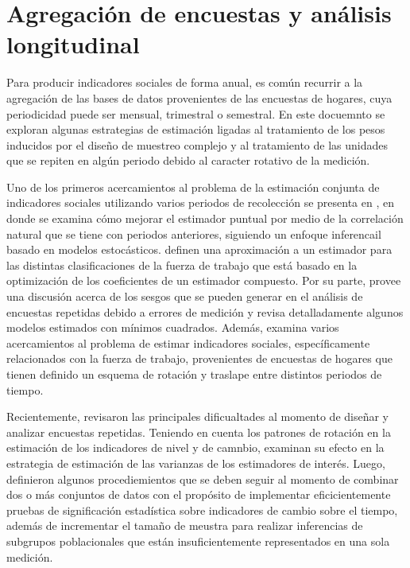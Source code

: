 \hypertarget{agregacion-de-encuestas-y-analisis-longitudinal}{%
\chapter{Agregación de encuestas y análisis longitudinal}\label{agregacion-de-encuestas-y-analisis-longitudinal}}

Para producir indicadores sociales de forma anual, es común recurrir a la agregación de las bases de datos provenientes de las encuestas de hogares, cuya periodicidad puede ser mensual, trimestral o semestral. En este docuemnto se exploran algunas estrategias de estimación ligadas al tratamiento de los pesos inducidos por el diseño de muestreo complejo y al tratamiento de las unidades que se repiten en algún periodo debido al caracter rotativo de la medición.

Uno de los primeros acercamientos al problema de la estimación conjunta de indicadores sociales utilizando varios periodos de recolección se presenta en \citet{Gurney_Daly_1965}, en donde se examina cómo mejorar el estimador puntual por medio de la correlación natural que se tiene con periodos anteriores, siguiendo un enfoque inferencail basado en modelos estocásticos. \citet{Lent_Miller_Duff_1999} definen una aproximación a un estimador para las distintas clasificaciones de la fuerza de trabajo que está basado en la optimización de los coeficientes de un estimador compuesto. Por su parte, \citet{Fuller_1990} provee una discusión acerca de los sesgos que se pueden generar en el análisis de encuestas repetidas debido a errores de medición y revisa detalladamente algunos modelos estimados con mínimos cuadrados. Además, \citet{Bell_2001} examina varios acercamientos al problema de estimar indicadores sociales, específicamente relacionados con la fuerza de trabajo, provenientes de encuestas de hogares que tienen definido un esquema de rotación y traslape entre distintos periodos de tiempo.

Recientemente, \citet{Steel_McLaren_2008} revisaron las principales dificualtades al momento de diseñar y analizar encuestas repetidas. Teniendo en cuenta los patrones de rotación en la estimación de los indicadores de nivel y de camnbio, examinan su efecto en la estrategia de estimación de las varianzas de los estimadores de interés. Luego, \citet{Lewis_2017} definieron algunos procediemientos que se deben seguir al momento de combinar dos o más conjuntos de datos con el propósito de implementar eficicientemente pruebas de significación estadística sobre indicadores de cambio sobre el tiempo, además de incrementar el tamaño de meustra para realizar inferencias de subgrupos poblacionales que están insuficientemente representados en una sola medición.

